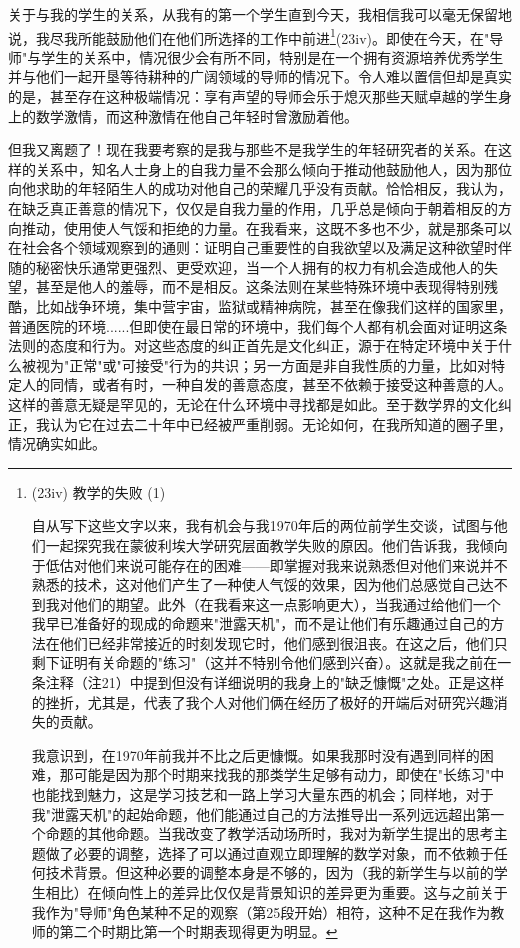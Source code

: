 关于与我的学生的关系，从我有的第一个学生直到今天，我相信我可以毫无保留地说，我尽我所能鼓励他们在他们所选择的工作中前进\footnote{(23iv) 教学的失败 (1) \par 自从写下这些文字以来，我有机会与我1970年后的两位前学生交谈，试图与他们一起探究我在蒙彼利埃大学研究层面教学失败的原因。他们告诉我，我倾向于低估对他们来说可能存在的困难——即掌握对我来说熟悉但对他们来说并不熟悉的技术，这对他们产生了一种使人气馁的效果，因为他们总感觉自己达不到我对他们的期望。此外（在我看来这一点影响更大），当我通过给他们一个我早已准备好的现成的命题来"泄露天机"，而不是让他们有乐趣通过自己的方法在他们已经非常接近的时刻发现它时，他们感到很沮丧。在这之后，他们只剩下证明有关命题的"练习"（这并不特别令他们感到兴奋）。这就是我之前在一条注释（注21）中提到但没有详细说明的我身上的"缺乏慷慨"之处。正是这样的挫折，尤其是，代表了我个人对他们俩在经历了极好的开端后对研究兴趣消失的贡献。

我意识到，在1970年前我并不比之后更慷慨。如果我那时没有遇到同样的困难，那可能是因为那个时期来找我的那类学生足够有动力，即使在"长练习"中也能找到魅力，这是学习技艺和一路上学习大量东西的机会；同样地，对于我"泄露天机"的起始命题，他们能通过自己的方法推导出一系列远远超出第一个命题的其他命题。当我改变了教学活动场所时，我对为新学生提出的思考主题做了必要的调整，选择了可以通过直观立即理解的数学对象，而不依赖于任何技术背景。但这种必要的调整本身是不够的，因为（我的新学生与以前的学生相比）在倾向性上的差异比仅仅是背景知识的差异更为重要。这与之前关于我作为"导师"角色某种不足的观察（第25段开始）相符，这种不足在我作为教师的第二个时期比第一个时期表现得更为明显。}(23iv)。即使在今天，在"导师"与学生的关系中，情况很少会有所不同，特别是在一个拥有资源培养优秀学生并与他们一起开垦等待耕种的广阔领域的导师的情况下。令人难以置信但却是真实的是，甚至存在这种极端情况：享有声望的导师会乐于熄灭那些天赋卓越的学生身上的数学激情，而这种激情在他自己年轻时曾激励着他。

但我又离题了！现在我要考察的是我与那些不是我学生的年轻研究者的关系。在这样的关系中，知名人士身上的自我力量不会那么倾向于推动他鼓励他人，因为那位向他求助的年轻陌生人的成功对他自己的荣耀几乎没有贡献。恰恰相反，我认为，在缺乏真正善意的情况下，仅仅是自我力量的作用，几乎总是倾向于朝着相反的方向推动，使用使人气馁和拒绝的力量。在我看来，这既不多也不少，就是那条可以在社会各个领域观察到的通则：证明自己重要性的自我欲望以及满足这种欲望时伴随的秘密快乐通常更强烈、更受欢迎，当一个人拥有的权力有机会造成他人的失望，甚至是他人的羞辱，而不是相反。这条法则在某些特殊环境中表现得特别残酷，比如战争环境，集中营宇宙，监狱或精神病院，甚至在像我们这样的国家里，普通医院的环境......但即使在最日常的环境中，我们每个人都有机会面对证明这条法则的态度和行为。对这些态度的纠正首先是文化纠正，源于在特定环境中关于什么被视为"正常"或"可接受"行为的共识；另一方面是非自我性质的力量，比如对特定人的同情，或者有时，一种自发的善意态度，甚至不依赖于接受这种善意的人。这样的善意无疑是罕见的，无论在什么环境中寻找都是如此。至于数学界的文化纠正，我认为它在过去二十年中已经被严重削弱。无论如何，在我所知道的圈子里，情况确实如此。

